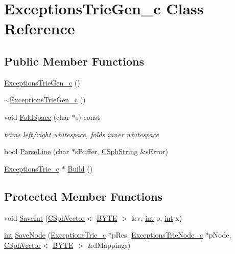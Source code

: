 \hypertarget{classExceptionsTrieGen__c}{\section{Exceptions\-Trie\-Gen\-\_\-c Class Reference}
\label{classExceptionsTrieGen__c}
}
\subsection*{Public Member Functions}
\begin{DoxyCompactItemize}
\item 
\hyperlink{classExceptionsTrieGen__c_a95d733ce708d010bbd2e13521fceb8d3}{Exceptions\-Trie\-Gen\-\_\-c} ()
\item 
\hyperlink{classExceptionsTrieGen__c_ad72e09b02ed20544c35a396cb60dd479}{$\sim$\-Exceptions\-Trie\-Gen\-\_\-c} ()
\item 
void \hyperlink{classExceptionsTrieGen__c_a0e558084a2fbcd161cee18fedc1f3a20}{Fold\-Space} (char $\ast$s) const 
\begin{DoxyCompactList}\small\item\em trims left/right whitespace, folds inner whitespace \end{DoxyCompactList}\item 
bool \hyperlink{classExceptionsTrieGen__c_abad0499b9802bfeec574317f7e71f4fa}{Parse\-Line} (char $\ast$s\-Buffer, \hyperlink{structCSphString}{C\-Sph\-String} \&s\-Error)
\item 
\hyperlink{classExceptionsTrie__c}{Exceptions\-Trie\-\_\-c} $\ast$ \hyperlink{classExceptionsTrieGen__c_a3daaa808bc0b7541eaba73f35058a308}{Build} ()
\end{DoxyCompactItemize}
\subsection*{Protected Member Functions}
\begin{DoxyCompactItemize}
\item 
void \hyperlink{classExceptionsTrieGen__c_af81bc9d02fcf6e9ea634ebf5e079e5f6}{Save\-Int} (\hyperlink{classCSphVector}{C\-Sph\-Vector}$<$ \hyperlink{sphinxstd_8h_a4ae1dab0fb4b072a66584546209e7d58}{B\-Y\-T\-E} $>$ \&v, \hyperlink{sphinxexpr_8cpp_a4a26e8f9cb8b736e0c4cbf4d16de985e}{int} p, \hyperlink{sphinxexpr_8cpp_a4a26e8f9cb8b736e0c4cbf4d16de985e}{int} x)
\item 
\hyperlink{sphinxexpr_8cpp_a4a26e8f9cb8b736e0c4cbf4d16de985e}{int} \hyperlink{classExceptionsTrieGen__c_ad978f0f13db4dfc213635199883fd029}{Save\-Node} (\hyperlink{classExceptionsTrie__c}{Exceptions\-Trie\-\_\-c} $\ast$p\-Res, \hyperlink{classExceptionsTrieNode__c}{Exceptions\-Trie\-Node\-\_\-c} $\ast$p\-Node, \hyperlink{classCSphVector}{C\-Sph\-Vector}$<$ \hyperlink{sphinxstd_8h_a4ae1dab0fb4b072a66584546209e7d58}{B\-Y\-T\-E} $>$ \&d\-Mappings)
\end{DoxyCompactItemize}
